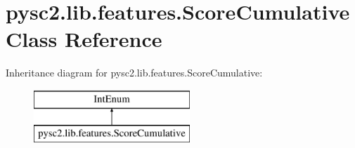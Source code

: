 \hypertarget{classpysc2_1_1lib_1_1features_1_1_score_cumulative}{}\section{pysc2.\+lib.\+features.\+Score\+Cumulative Class Reference}
\label{classpysc2_1_1lib_1_1features_1_1_score_cumulative}
Inheritance diagram for pysc2.\+lib.\+features.\+Score\+Cumulative\+:\begin{figure}[H]
\begin{center}
\leavevmode
\includegraphics[height=2.000000cm]{classpysc2_1_1lib_1_1features_1_1_score_cumulative}
\end{center}
\end{figure}
